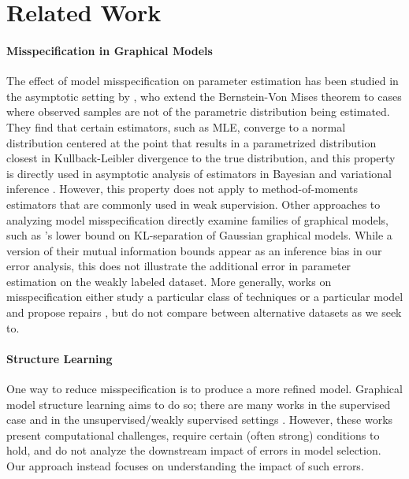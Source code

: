  \section{Related Work}

\paragraph{Misspecification in Graphical Models}

The effect of model misspecification on parameter estimation has been studied in the asymptotic setting by \cite{kleijn2012}, who extend the Bernstein-Von Mises theorem to cases where observed samples are not of the parametric distribution being estimated. They find that certain estimators, such as MLE, converge to a normal distribution centered at the point that results in a parametrized distribution closest in Kullback-Leibler divergence to the true distribution, and this property is directly used in asymptotic analysis of estimators in Bayesian and variational inference \cite{wang2019variational, hongmartin2020}. However, this property does not apply to method-of-moments estimators that are commonly used in weak supervision. Other approaches to analyzing model misspecification directly examine families of graphical models, such as \cite{JogL15}'s lower bound on KL-separation of Gaussian graphical models. While a version of their mutual information bounds appear as an inference bias in our error analysis, this does not illustrate the additional error in parameter estimation on the weakly labeled dataset. More generally, works on misspecification either study a particular class of techniques \cite{Blasi13} or a particular model and propose repairs \cite{Grunwald17}, but do not compare between alternative datasets as we seek to.

\paragraph{Structure Learning}
One way to reduce misspecification is to produce a more refined model. Graphical model structure learning aims to do so; there are many works in the supervised case \cite{Ravikumar11, Loh13} and in the unsupervised/weakly supervised settings \cite{Chandrasekaran12,Meng14, bach2017learning, varma2019learning}. However, these works present computational challenges, require certain (often strong) conditions to hold, and do not analyze the downstream impact of errors in model selection. Our approach instead focuses on understanding the impact of such errors.

